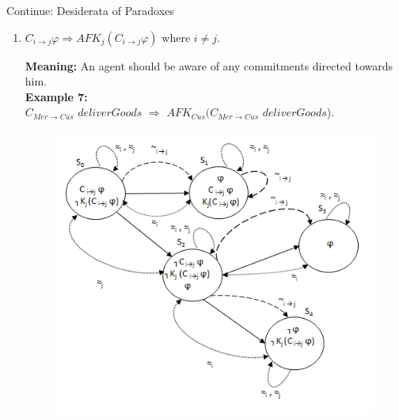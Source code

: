 \documentclass{beamer}
\begin{document}
\begin{frame}{Continue: Desiderata of Paradoxes}
\begin{enumerate}
    \vspace{0.2cm} \item [P7.][\textbf{Knowing the commitment of the
other}]

$C_{i\rightarrow j} \varphi \Rightarrow AF K_j (C_{i\rightarrow j}
\varphi) $ where $i \neq j$.

\textbf{Meaning:} An agent should be aware of any commitments
directed towards him.\\
\textbf{Example 7:}\\
$C_{Mer \rightarrow Cus}$ $deliverGoods$ $\Rightarrow $ $AF K_{Cus}(C_{Mer \rightarrow Cus}$
$deliverGoods$).
\begin{figure}[htbp]
\centering
\includegraphics[width=.50 \columnwidth]{figures/figure5.png}
\end{figure}

\end{enumerate}
\end{frame}
\end{document}
